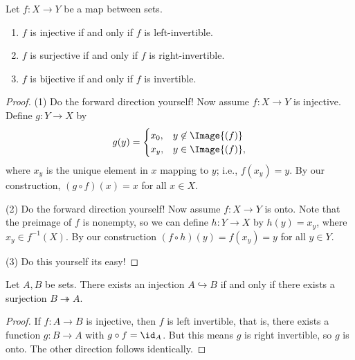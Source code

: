     \begin{proposition}
        Let $f:X \rightarrow Y$ be a map between sets.
            \begin{enumerate}
                \item $f$ is injective if and only if $f$ is left-invertible.
                \item $f$ is surjective if and only if $f$ is right-invertible.
                \item $f$ is bijective if and only if $f$ is invertible. 
            \end{enumerate}
    \end{proposition}
        \begin{proof}
            (1) {\color{red} Do the forward direction yourself!} Now assume $f: X \rightarrow Y$ is injective. Define $g:Y \rightarrow X$ by
                \begin{equation*}
                    g(y) = 
                \begin{cases}
                    x_0, & y \not\in \Image{(f)} \\
                    x_y, & y \in \Image{(f)},
                \end{cases}
                \end{equation*}
            where $x_y$ is the unique element in $x$ mapping to $y$; i.e., $f(x_y) = y$. By our construction, $(g \circ f)(x) = x$ for all $x \in X$. 

            (2) {\color{red} Do the forward direction yourself!} Now assume $f:X \rightarrow Y$ is onto. Note that the preimage of $f$ is nonempty, so we can define $h:Y \rightarrow X$ by $h(y) = x_y$, where $x_y \in f^{-1}(X)$. By our construction $(f \circ h)(y) = f(x_y) = y$ for all $y \in Y$.

            (3) {\color{red} Do this yourself its easy!}
        \end{proof}

        \begin{corollary}
            Let $A,B$ be sets. There exists an injection $A \hookrightarrow B$ if and only if there exists a surjection $B \twoheadrightarrow A$.
        \end{corollary}
            \begin{proof}
                If $f:A \rightarrow B$ is injective, then $f$ is left invertible, that is, there exists a function $g:B \rightarrow A$ with $g \circ f = \id_A$. But this means $g$ is right invertible, so $g$ is onto. The other direction follows identically.
            \end{proof}
    
